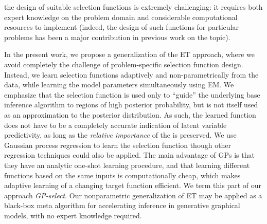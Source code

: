  the design of suitable selection functions is extremely challenging: it requires both expert knowledge
on the problem domain and considerable computational resources to implement
 (indeed, the design of such functions for  particular problems
has been a major contribution in previous work on the topic).

In the present work, we propose a generalization of the ET approach, where
we avoid completely the challenge of problem-specific selection function design.
Instead, we learn selection functions  adaptively and non-parametrically
from the data,
 while learning the model
parameters  simultaneously using EM.
We emphasize that the selection function is  used only to ``guide'' the underlying
base inference algorithm to regions of high posterior probability, but is not itself
used as an approximation to the posterior distribution. 
As such, the learned
function does not have to be a completely accurate indication of latent
variable predictivity,
as long as the \emph{relative importance} of the  is preserved.
We use  Gaussian process
regression \citep{RasmussenGPbook} to learn the selection function  though other regression techniques could
also be applied. The main advantage of GPs
is that they have an analytic one-shot learning procedure, and that learning different
functions based on the same inputs is computationally cheap, which makes adaptive learning
of a changing target function efficient. We term this part of our approach
\textit{GP-select}.
Our nonparametric generalization of  ET may be applied as a black-box
meta algorithm for accelerating inference in  generative graphical models,
with no expert knowledge required.






